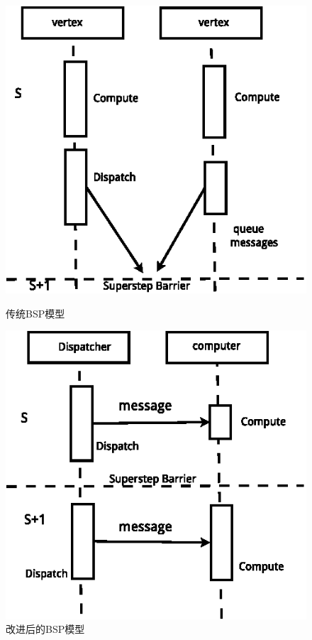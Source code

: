 \begin{figure}[htbp]
\centering
\begin{minipage}{0.4\textwidth}
\centering
\includegraphics[width=\textwidth]{myfigures/sequentialbsp_new}
\caption{传统BSP模型}\label{fig:traBSP}
\end{minipage}
\begin{minipage}{0.4\textwidth}
\centering
\includegraphics[width=\textwidth]{myfigures/computemodel}
\caption{改进后的BSP模型}\label{fig:newBSP}
\end{minipage}
\vspace{\baselineskip}
\end{figure}


